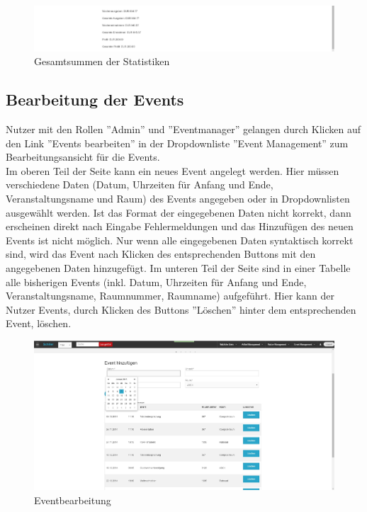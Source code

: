\documentclass[a4paper]{article}
\begin{document}
\begin{figure}[ht]
\centering
\includegraphics[width=1.0\textwidth]{Statistiken2.jpg}
\caption{Gesamtsummen der Statistiken}
\end{figure}
\smallskip

\FloatBarrier

\subsection{Bearbeitung der Events}

Nutzer mit den Rollen ''Admin'' und ''Eventmanager'' gelangen durch Klicken auf den Link ''Events bearbeiten'' in der Dropdownliste ''Event Management'' zum Bearbeitungsansicht für die Events. \\
Im oberen Teil der Seite kann ein neues Event angelegt werden. Hier müssen verschiedene Daten (Datum, Uhrzeiten für Anfang und Ende, Veranstaltungsname und Raum) des Events angegeben oder in Dropdownlisten ausgewählt werden. Ist das Format der eingegebenen Daten nicht korrekt, dann erscheinen direkt nach Eingabe Fehlermeldungen und das Hinzufügen des neuen Events ist nicht möglich. Nur wenn alle eingegebenen Daten syntaktisch korrekt sind, wird das Event nach Klicken des entsprechenden Buttons mit den angegebenen Daten hinzugefügt.
Im unteren Teil der Seite sind in einer Tabelle alle bisherigen Events (inkl. Datum, Uhrzeiten für Anfang und Ende, Veranstaltungsname, Raumnummer, Raumname) aufgeführt. Hier kann der Nutzer Events, durch Klicken des Buttons ''Löschen'' hinter dem entsprechenden Event, löschen.

\begin{figure}[ht]
\centering
\includegraphics[width=1.0\textwidth]{Events.jpg}
\caption{Eventbearbeitung}
\end{figure}
\smallskip
\end{document}
